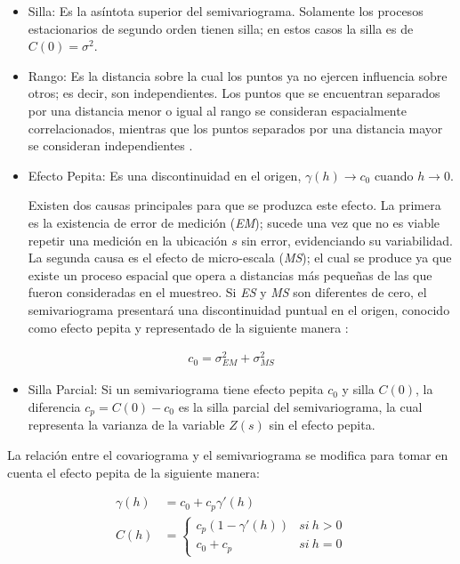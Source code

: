 \documentclass[
]{book}
\providecommand{\tightlist}{%
  \setlength{\itemsep}{0pt}\setlength{\parskip}{0pt}}
\begin{document}
\begin{itemize}
\item
  Silla: Es la asíntota superior del semivariograma. Solamente los procesos estacionarios de segundo orden tienen silla; en estos casos la silla es de \(C(0)=\sigma^2\).
\item
  Rango: Es la distancia sobre la cual los puntos ya no ejercen influencia sobre otros; es decir, son independientes. Los puntos que se encuentran separados por una distancia menor o igual al rango se consideran espacialmente correlacionados, mientras que los puntos separados por una distancia mayor se consideran independientes \citep{marta}.
\item
  Efecto Pepita: Es una discontinuidad en el origen, \(\gamma(h)\to c_0\) cuando \(h\to 0\).

  Existen dos causas principales para que se produzca este efecto. La primera es la existencia de error de medición (\emph{EM}); sucede una vez que no es viable repetir una medición en la ubicación \(s\) sin error, evidenciando su variabilidad. La segunda causa es el efecto de micro-escala (\emph{MS}); el cual se produce ya que existe un proceso espacial que opera a distancias más pequeñas de las que fueron consideradas en el muestreo. Si \emph{ES} y \emph{MS} son diferentes de cero, el semivariograma presentará una discontinuidad puntual en el origen, conocido como efecto pepita y representado de la siguiente manera \citep{marta}:
\end{itemize}

\begin{align}
        c_0=\sigma^2_{EM}+\sigma_{MS}^2  
  \end{align}

\begin{itemize}
\tightlist
\item
  Silla Parcial: Si un semivariograma tiene efecto pepita \(c_0\) y silla \(C(0)\), la diferencia \(c_p=C(0)-c_0\) es la silla parcial del semivariograma, la cual representa la varianza de la variable \(Z(s)\) sin el efecto pepita.
\end{itemize}

La relación entre el covariograma y el semivariograma se modifica para tomar en cuenta el efecto pepita de la siguiente manera:

\begin{align}
    \gamma(h) &= c_0+c_{p}\gamma'(h)\\
    C(h) &= \left \{ \begin{matrix} c_p(1-\gamma'(h)) & si \ h>0\\ 
    c_0+c_p & si \ h=0 \end{matrix}\right. 
\end{align}
\end{document}
